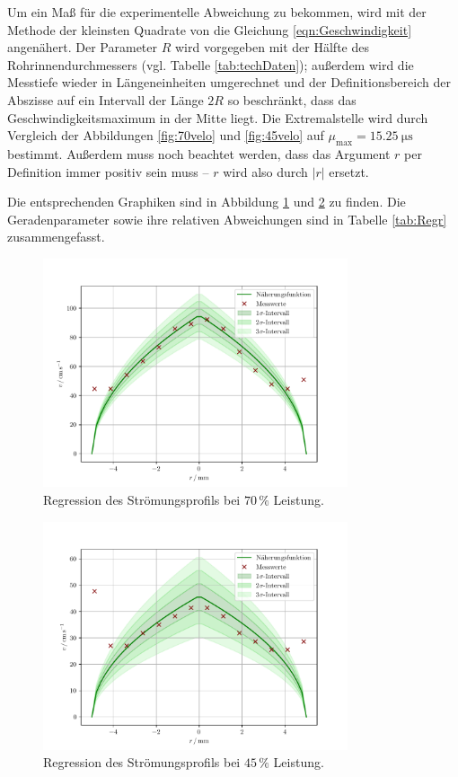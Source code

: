 Um ein Maß für die experimentelle Abweichung zu bekommen, wird mit der Methode der kleinsten Quadrate von \cite{scipy} 
die Gleichung \eqref{eqn:Geschwindigkeit} angenähert. 
Der Parameter $R$ wird vorgegeben mit der Hälfte des Rohrinnendurchmessers (vgl. Tabelle \ref{tab:techDaten}); außerdem wird die Messtiefe wieder in Längeneinheiten umgerechnet und der Definitionsbereich 
der Abszisse auf ein Intervall der Länge $2R$ so beschränkt, dass das Geschwindigkeitsmaximum in der Mitte liegt. 
Die Extremalstelle wird durch Vergleich der Abbildungen \ref{fig:70velo} und \ref{fig:45velo} auf $\mu_\text{max}=\SI{15.25}{\micro\second}$
bestimmt. 
Außerdem muss noch beachtet werden, dass das Argument $r$ per Definition immer positiv sein muss -- $r$ wird also durch $|r|$ ersetzt. 

Die entsprechenden Graphiken sind in Abbildung \ref{fig:str70} und \ref{fig:str45} zu finden. 
Die Geradenparameter sowie ihre relativen Abweichungen sind in Tabelle \ref{tab:Regr} zusammengefasst. 
\begin{figure}
    \centering
    \includegraphics[width=0.8\textwidth]{plots/70regr.pdf}
    \caption{Regression des Strömungsprofils bei $70\,\%$ Leistung.}
    \label{fig:str70}
\end{figure}
\begin{figure}
    \centering
    \includegraphics[width=0.8\textwidth]{plots/45regr.pdf}
    \caption{Regression des Strömungsprofils bei $45\,\%$ Leistung.}
    \label{fig:str45}
\end{figure}
